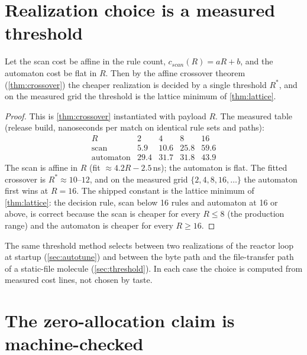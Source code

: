 \section{Realization choice is a measured threshold}\label{sec:route-crossover}

\begin{theorem}\label{thm:hybrid}
Let the scan cost be affine in the rule count,
$c_{scan} (R) = aR + b$, and the automaton cost be flat in $R$. Then by
the affine crossover theorem (\autoref{thm:crossover}) the cheaper
realization is decided by a single threshold $R^{\ast}$, and on the
measured grid the threshold is the lattice minimum of
\autoref{thm:lattice}.
\end{theorem}

\begin{proof}
This is \autoref{thm:crossover} instantiated with payload $R$. The
measured table (release build, nanoseconds per match on identical rule
sets and paths):
\[
\begin{array}{l|rrrr}
R & 2 & 4 & 8 & 16\\\hline
\text{scan} & 5.9 & 10.6 & 25.8 & 59.6\\
\text{automaton} & 29.4 & 31.7 & 31.8 & 43.9
\end{array}
\]
The scan is affine in $R$ (fit $\approx 4.2R - 2.5$\,ns); the
automaton is flat. The fitted crossover is $R^{\ast} \approx 10$--$12$,
and on the measured grid $\{2,4,8,16,\ldots\}$ the automaton first
wins at $R = 16$. The shipped constant is the lattice minimum of
\autoref{thm:lattice}: the decision rule, scan below 16 rules and
automaton at 16 or above, is correct because the scan is cheaper for
every $R \leq 8$ (the production range) and the automaton is cheaper
for every $R \geq 16$.
\end{proof}

\begin{remark}
The same threshold method selects between two realizations of the
reactor loop at startup (\autoref{sec:autotune}) and between the byte
path and the file-transfer path of a static-file molecule
(\autoref{sec:threshold}). In each case the choice is computed from
measured cost lines, not chosen by taste.
\end{remark}

\section{The zero-allocation claim is machine-checked}\label{sec:alloc-count}

